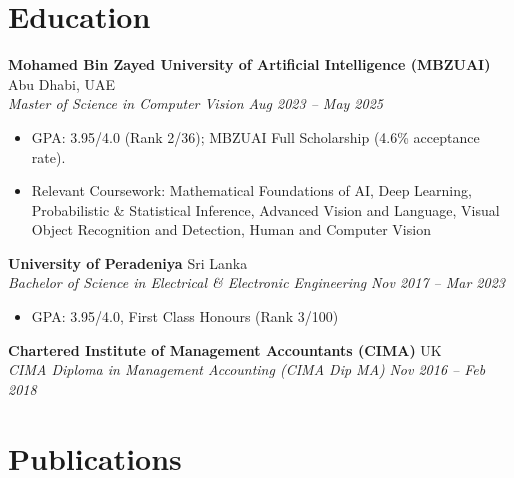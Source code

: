 \documentclass[10pt]{article}
\newcommand{\cventry}[2]{\textbf{#1} \hfill \textcolor{midtext}{#2} \\}
\newcommand{\cvrole}[2]{\textcolor{midtext}{\textit{#1}} \hfill \textcolor{midtext}{\textit{#2}} \\}
\begin{document}
\section{Education}

\cventry{Mohamed Bin Zayed University of Artificial Intelligence (MBZUAI)}{Abu Dhabi, UAE}
\cvrole{Master of Science in Computer Vision}{Aug 2023 -- May 2025}
\vspace{-7pt}
\begin{itemize}
    \item GPA: 3.95/4.0 (Rank 2/36); MBZUAI Full Scholarship (4.6\% acceptance rate).
    \item Relevant Coursework: Mathematical Foundations of AI, Deep Learning, Probabilistic \& Statistical Inference, Advanced Vision and Language, Visual Object Recognition and Detection, Human and Computer Vision
\end{itemize}

\vspace{4pt}
\cventry{University of Peradeniya}{Sri Lanka}
\cvrole{Bachelor of Science in Electrical \& Electronic Engineering}{Nov 2017 -- Mar 2023}
\vspace{-7pt}
\begin{itemize}
    \item GPA: 3.95/4.0, First Class Honours (Rank 3/100)
\end{itemize}

\vspace{4pt}

\cventry{Chartered Institute of Management Accountants (CIMA)}{UK}
\cvrole{CIMA Diploma in Management Accounting (CIMA Dip MA)}{Nov 2016 -- Feb 2018}

\section{Publications}
\end{document}

